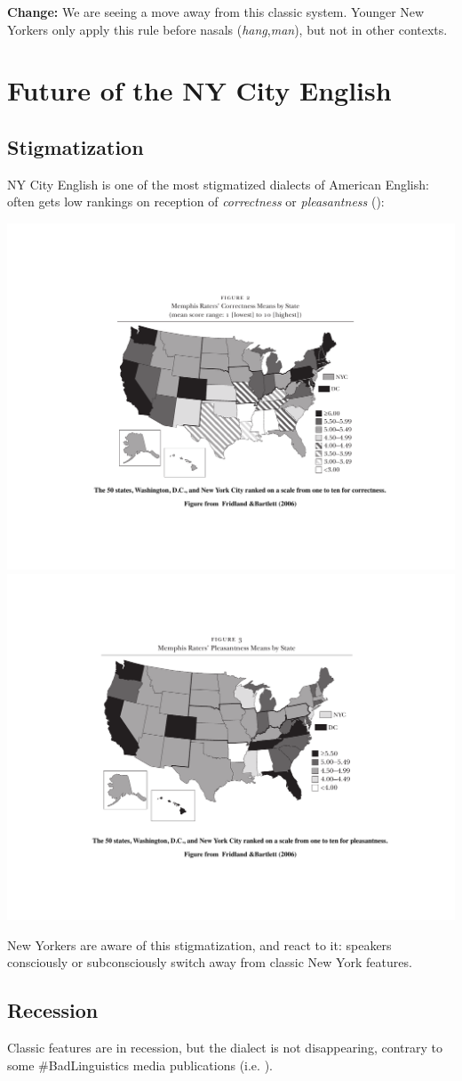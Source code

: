 \documentclass[11pt]{article}
\newcommand{\1}{$'$}
\newcommand{\2}{$''$}
\newcommand{\3}{$'''$}
\begin{document}
\noindent \textbf{Change:} We are seeing a move away from this classic system. Younger New Yorkers only apply this rule before nasals (\emph{hang},\emph{man}), but not in other contexts.

\section{Future of the NY City English}

\subsection{Stigmatization}

NY City English is one of the most stigmatized dialects of American English: often gets low rankings on reception of \emph{correctness} or \emph{pleasantness} (\citealp{FridlandBartless:2006}):

\includegraphics[width=.45\textwidth]{ratings1}\vrule\includegraphics[width=.45\textwidth]{ratings2}

New Yorkers are aware of this stigmatization, and react to it: speakers consciously or subconsciously switch away from classic New York features.

\subsection{Recession}

Classic features are in recession, but the dialect is not disappearing, contrary to some \#BadLinguistics media publications (i.e. \citealp{Fuhgeddaboudit:2015}).
\end{document}
